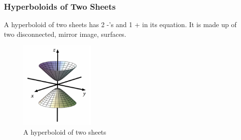 \subsubsection{Hyperboloids of Two Sheets}
\noindent
A hyperboloid of two sheets has 2 -'s and 1 + in its equation. It is made up of two disconnected, mirror image, surfaces.

\begin{figure}[H]
	\centering
	\includegraphics[width=0.33\textwidth]{./Images/differentialMultivariableCalculus/two_sheets.png}
	\caption{A hyperboloid of two sheets}
\end{figure}